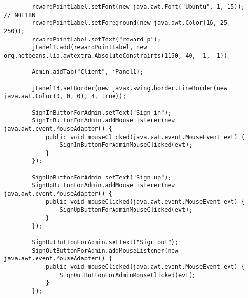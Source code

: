 \documentclass[12pt,a4paper]{article}
\begin{document}
\begin{lstlisting}
        rewardPointLabel.setFont(new java.awt.Font("Ubuntu", 1, 15)); // NOI18N
        rewardPointLabel.setForeground(new java.awt.Color(16, 25, 250));
        rewardPointLabel.setText("reward p");
        jPanel1.add(rewardPointLabel, new org.netbeans.lib.awtextra.AbsoluteConstraints(1160, 40, -1, -1));

        Admin.addTab("Client", jPanel1);

        jPanel13.setBorder(new javax.swing.border.LineBorder(new java.awt.Color(0, 0, 0), 4, true));

        SignInButtonForAdmin.setText("Sign in");
        SignInButtonForAdmin.addMouseListener(new java.awt.event.MouseAdapter() {
            public void mouseClicked(java.awt.event.MouseEvent evt) {
                SignInButtonForAdminMouseClicked(evt);
            }
        });

        SignUpButtonForAdmin.setText("Sign up");
        SignUpButtonForAdmin.addMouseListener(new java.awt.event.MouseAdapter() {
            public void mouseClicked(java.awt.event.MouseEvent evt) {
                SignUpButtonForAdminMouseClicked(evt);
            }
        });

        SignOutButtonForAdmin.setText("Sign out");
        SignOutButtonForAdmin.addMouseListener(new java.awt.event.MouseAdapter() {
            public void mouseClicked(java.awt.event.MouseEvent evt) {
                SignOutButtonForAdminMouseClicked(evt);
            }
        });


\end{lstlisting}
\end{document}
